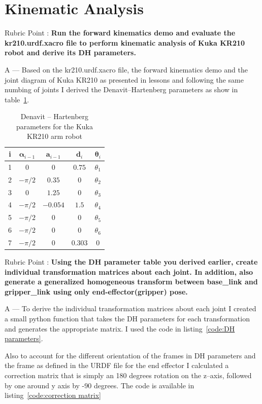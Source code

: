 \documentclass[a4paper,11pt]{article}
\newcounter{question}
\newcommand\Que[1]{%
	   \leavevmode\par
	   \stepcounter{question}
	   \noindent
	   Rubric Point \thequestion :  {\bf #1}\par}
\newcommand\Ans[2][]{%
    \leavevmode\par\noindent
   {\leftskip37pt
    A --- \textbf{#1}#2\par}}
\begin{document}
\section{Kinematic Analysis}
\Que{Run the forward kinematics demo and evaluate the kr210.urdf.xacro file to perform kinematic analysis of Kuka KR210 robot and derive its DH parameters.}
\Ans{Based on the kr210.urdf.xacro file, the forward kinematics demo and the joint diagram of Kuka KR210 as presented in lessons and following the same numbing of joints I derived the Denavit--Hartenberg parameters as show in table~\ref{table:dh parameters}.}
\begin{table}[!h]
	\caption{Denavit -- Hartenberg parameters for the Kuka KR210 arm robot}
	\label{table:dh parameters}
	\begin{center}
		\begin{tabular}{ | c | c | c | c | c | }
			\hline
			{\bf i} & $\boldsymbol \alpha_{i-1}$ & $\mathbf a_{i-1}$ & $\mathbf d_{i}$ & $\boldsymbol \theta_{i}$ \\ [0.5ex] 
			\hline
			\rule{0pt}{1.2em}1 & $0$ & $0$ & $0.75$ & $\theta_{1}$ \\ 
			2 & $-\pi/2$ & $0.35$ & $0$ & $\theta_{2}$ \\
			3 & $0$ & $1.25$ & $0$ & $\theta_{3}$ \\
			4 & $-\pi/2$ & $-0.054$ & $1.5$ & $\theta_{4}$ \\
			5 & $-\pi/2$ & $0$ & $0$ & $\theta_{5}$ \\
			6 & $-\pi/2$ & $0$ & $0$ & $\theta_{6}$ \\
			7 & $-\pi/2$ & $0$ & $0.303$ & $0$ \\
			\hline
		\end{tabular}
	\end{center}
\end{table}
\Que{ Using the DH parameter table you derived earlier, create individual transformation matrices about each joint. In addition, also generate a generalized homogeneous transform between base\_link and gripper\_link using only end-effector(gripper) pose.}
\Ans{To derive the individual transformation matrices about each joint I created a small python function that takes the DH parameters for each transformation and generates the appropriate matrix. I used the code in listing~\ref{code:DH parameters}.

Also to account for the different orientation of the frames in DH parameters and the frame as defined in the URDF file for the end effector I calculated a correction matrix that is simply an 180 degrees rotation on the z--axis, followed by one around y axis by -90 degrees. The code is available in listing~\ref{code:correction matrix}}
 
\end{document}
